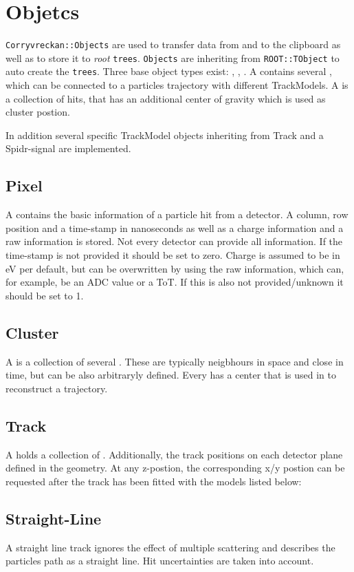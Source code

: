 \section{Objetcs}
\label{sec:objects}
\texttt{Corryvreckan::Objects} are used to transfer data from and to the clipboard as well as to store it to \textit{root} \texttt{trees}. 
\texttt{Objects} are inheriting from \texttt{ROOT::TObject} to auto create the \texttt{trees}. 
Three base object types exist: \pixel, \cluster, \track.
A \track contains several \cluster, which can be connected to a particles
trajectory with different TrackModels.
A \cluster is a collection of hits, that has an additional center of gravity
which is used as cluster postion.

In addition several specific TrackModel objects inheriting from Track and a Spidr-signal are implemented. 

\subsection*{Pixel}
A \pixel contains the basic information of a particle hit from a detector. A column, row position and a time-stamp in nanoseconds as well as a charge information and a raw information is stored. Not every detector can provide all information. If the time-stamp is not provided it should be set to zero. Charge is assumed to be in eV per default, but can be overwritten by using the raw information, which can, for example, be an ADC value or a ToT. If this is also not provided/unknown it should be set to 1. 

\subsection*{Cluster}
A \cluster is a collection of several \pixel. These \pixel are typically
neigbhours in space and close in time, but can be also arbitraryly
defined. Every \cluster has a center that is used in \track to reconstruct a trajectory.  

\subsection{Track}
A \track holds a collection of \cluster. Additionally, the track positions on
each detector plane defined in the geometry. At any z-postion, the
corresponding x/y postion can be requested after the track has been fitted
with the models listed below:

\subsection*{Straight-Line}
A straight line track ignores the effect of multiple scattering and describes
the particles path as a straight line. Hit uncertainties are taken into account.
